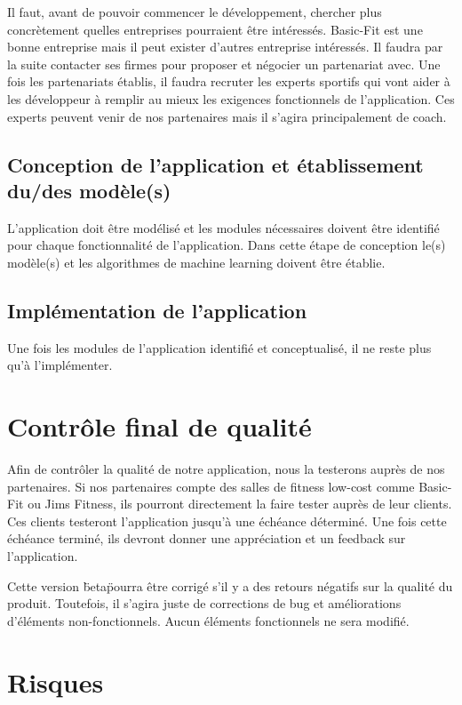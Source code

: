 Il faut, avant de pouvoir commencer le développement, chercher plus concrètement quelles entreprises pourraient être intéressés. Basic-Fit est une bonne entreprise mais il peut exister d'autres entreprise intéressés. Il faudra par la suite contacter ses firmes pour proposer et négocier un partenariat avec.
Une fois les partenariats établis, il faudra recruter les experts sportifs qui vont aider à les développeur à remplir au mieux les exigences fonctionnels de l'application. Ces experts peuvent venir de nos partenaires mais il s'agira principalement de coach. 

\subsection*{Conception de l'application et établissement du/des modèle(s)}

L'application doit être modélisé et les modules nécessaires doivent être identifié pour chaque fonctionnalité de l'application. Dans cette étape de conception le(s) modèle(s) et les algorithmes de machine learning doivent être établie. 

\subsection*{Implémentation de l'application}

Une fois les modules de l'application identifié et conceptualisé, il ne reste plus qu'à l'implémenter. 

\section{Contrôle final de qualité}

Afin de contrôler la qualité de notre application, nous la testerons auprès de nos partenaires. Si nos partenaires compte des salles de fitness low-cost comme Basic-Fit ou Jims Fitness, ils pourront directement la faire tester auprès de leur clients. Ces clients testeront l'application jusqu'à une échéance déterminé. Une fois cette échéance terminé, ils devront donner une appréciation et un feedback sur l'application.

Cette version \"beta\" pourra être corrigé s'il y a des retours négatifs sur la qualité du produit. Toutefois, il s'agira juste de corrections de bug et améliorations d'éléments non-fonctionnels. Aucun éléments fonctionnels ne sera modifié. 

\section{Risques}

